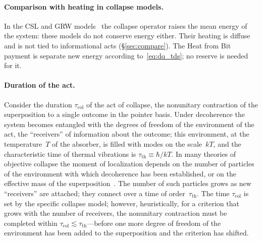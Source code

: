 \documentclass[11pt,a4paper]{article}
\newcommand{\Sref}[1]{\hyperref[#1]{\S\ref{#1}}}
\begin{document}
\paragraph{Comparison with heating in collapse models.}
In the CSL and GRW models~\cite{grw1986,pearle1989,bassi2013} the collapse operator raises the mean energy of the system: these models do not conserve energy either. Their heating is diffuse and is not tied to informational acts (\Sref{sec:compare}). The Heat from Bit payment is separate new energy according to~\eqref{eq:dq_tds}; no reserve is needed for it.

\paragraph{Duration of the act.}
Consider the duration $\tau_{\mathrm{col}}$ of the act of collapse, the nonunitary contraction of the superposition to a single outcome in the pointer basis. Under decoherence the system becomes entangled with the degrees of freedom of the environment of the act, the ``receivers'' of information about the outcome; this environment, at the temperature~$T$ of the absorber, is filled with modes on the scale~$kT$, and the characteristic time of thermal vibrations is $\tau_{\mathrm{th}} \equiv \hbar/kT$. In many theories of objective collapse the moment of localization depends on the number of particles of the environment with which decoherence has been established, or on the effective mass of the superposition~\cite{grw1986,bassi2013,zurek2009,ponfilenok2026threshold,ponfilenok2026branch}. The number of such particles grows as new ``receivers'' are attached; they connect over a time of order~$\tau_{\mathrm{th}}$. The time $\tau_{\mathrm{col}}$ is set by the specific collapse model; however, heuristically, for a criterion that grows with the number of receivers, the nonunitary contraction must be completed within $\tau_{\mathrm{col}} \lesssim \tau_{\mathrm{th}}$---before one more degree of freedom of the environment has been added to the superposition and the criterion has shifted.
\end{document}
